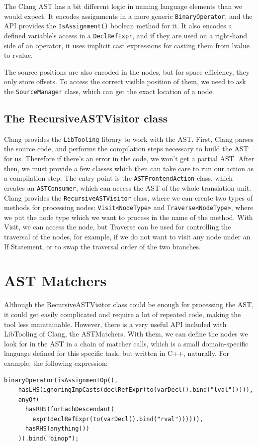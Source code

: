 \documentclass[oneside,12pt,a4paper]{book}
\begin{document}
The Clang AST has a bit different logic in naming language elements than we would expect. It encodes assignments in a more generic \texttt{BinaryOperator}, and the API provides the \texttt{IsAssignment()} boolean method for it. It also encodes a defined variable's access in a \texttt{DeclRefExpr}, and if they are used on a right-hand side of an operator, it uses implicit cast expressions for casting them from lvalue to rvalue.

The source positions are also encoded in the nodes, but for space efficiency, they only store offsets. To access the correct visible position of them, we need to ask the \texttt{SourceManager} class, which can get the exact location of a node. 

\subsection{The RecursiveASTVisitor class}

Clang provides the \texttt{LibTooling} library to work with the AST. First, Clang parses the source code, and performs the compilation steps necessary to build the AST for us. Therefore if there's an error in the code, we won't get a partial AST. After then, we must provide a few classes which then can take care to run our action as a compilation step. The entry point is the \texttt{ASTFrontendAction} class, which creates an \texttt{ASTConsumer}, which can access the AST of the whole translation unit. Clang provides the \texttt{RecursiveASTVisitor} class, where we can create two types of methods for processing nodes: \texttt{Visit<NodeType>} and \texttt{Traverse<NodeType>}, where we put the node type which we want to process in the name of the method. With Visit, we can access the node, but Traverse can be used for controlling the traversal of the nodes, for example, if we do not want to visit any node under an If Statement, or to swap the traversal order of the two branches.

\section{AST Matchers}

Although the RecursiveASTVisitor class could be enough for processing the AST, it could get easily complicated and require a lot of repeated code, making the tool less maintainable. However, there is a very useful API included with LibTooling of Clang, the ASTMatchers. With them, we can define the nodes we look for in the AST in a chain of matcher calls, which is a small domain-specific language defined for this specific task, but written in C++, naturally. For example, the following expression:
\begin{lstlisting}
binaryOperator(isAssignmentOp(),
    hasLHS(ignoringImpCasts(declRefExpr(to(varDecl().bind("lval"))))),
    anyOf(
      hasRHS(forEachDescendant(
      	expr(declRefExpr(to(varDecl().bind("rval")))))),
      hasRHS(anything())
    )).bind("binop");
\end{lstlisting}
\end{document}
